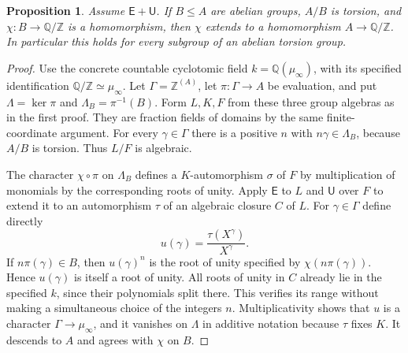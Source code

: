 \documentclass[11pt,a4paper]{article}
\newtheorem{proposition}[theorem]{Proposition}
\theoremstyle{definition}\newtheorem{definition}[theorem]{Definition}
\theoremstyle{remark}\newtheorem{remark}[theorem]{Remark}
\newcommand{\E}{\mathsf E}\newcommand{\U}{\mathsf U}
\newcommand{\Q}{\mathbb Q}\newcommand{\F}{\mathbb F}
\begin{document}
\begin{proposition}\label{prop:torsion-character-extension}
Assume $\E+\U$.  If $B\leq A$ are abelian groups, $A/B$ is torsion,
and $\chi:B\to\Q/\mathbb Z$ is a homomorphism, then $\chi$ extends
to a homomorphism $A\to\Q/\mathbb Z$.
In particular this holds for every subgroup of an abelian torsion group.
\end{proposition}
\begin{proof}
Use the concrete countable cyclotomic field $k=\Q(\mu_\infty)$, with its
specified identification $\Q/\mathbb Z\simeq\mu_\infty$.
Let $\Gamma=\mathbb Z^{(A)}$, let $\pi:\Gamma\to A$ be evaluation,
and put $\Lambda=\ker\pi$ and $\Lambda_B=\pi^{-1}(B)$.
Form $L,K,F$ from these three group algebras as in the first proof.
They are fraction fields of domains by the same finite-coordinate argument.
For every $\gamma\in\Gamma$ there is a positive $n$ with
$n\gamma\in\Lambda_B$, because $A/B$ is torsion.
Thus $L/F$ is algebraic.

The character $\chi\circ\pi$ on $\Lambda_B$ defines a $K$-automorphism
$\sigma$ of $F$ by multiplication of monomials by the corresponding roots
of unity.  Apply $\E$ to $L$ and $\U$ over $F$ to extend it to an
automorphism $\tau$ of an algebraic closure $C$ of $L$.
For $\gamma\in\Gamma$ define directly
\[
             u(\gamma)=\frac{\tau(X^\gamma)}{X^\gamma}.
\]
If $n\pi(\gamma)\in B$, then $u(\gamma)^n$ is the root of unity
specified by $\chi(n\pi(\gamma))$.  Hence $u(\gamma)$ is itself a root
of unity. All roots of unity in $C$ already lie in the specified $k$,
since their polynomials split there.  This verifies its range without making a simultaneous choice
of the integers $n$.  Multiplicativity shows that $u$ is a character
$\Gamma\to\mu_\infty$, and it vanishes on $\Lambda$ in additive
notation because $\tau$ fixes $K$.  It descends to $A$ and agrees with
$\chi$ on $B$.
\end{proof}
\end{document}
